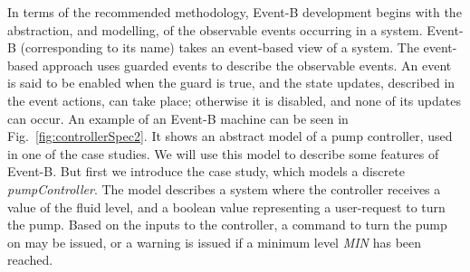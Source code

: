 In terms of the recommended methodology, Event-B development begins with the abstraction, and modelling, of the observable events occurring in a system. Event-B (corresponding to its name) takes an event-based view of a system. The event-based approach uses guarded events to describe the observable events. An event is said to be enabled when the guard is true, and the state updates, described in the event actions, can take place; otherwise it is disabled, and none of its updates can occur.  An example of an Event-B machine can be seen in Fig.~\ref{fig:controllerSpec2}. It shows an abstract model of a pump controller, used in one of the case studies. We will use this model to describe some features of Event-B. But first we introduce the case study, which models a discrete \emph{pumpController}. The model describes a system where the controller receives a value of the fluid level, and a boolean value representing a user-request to turn the pump. Based on the inputs to the controller, a command to turn the pump on may be issued, or a warning is issued if a minimum level \emph{MIN} has been reached.    
%
%
%
